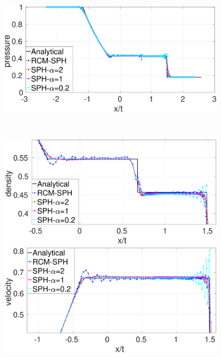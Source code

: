 \begin{figure}
\begin{minipage}{.495\textwidth}
    \end{minipage}%
    \begin{minipage}{.495 \textwidth}
        \centering
        \includegraphics[width=0.99 \textwidth]{Chapter-4/Figures/Sod/RCM-Sod-SPH-alf-p}
    \end{minipage}%
    \\
    \begin{minipage}{.495\textwidth}
        \centering
        \includegraphics[width=0.99 \textwidth]{Chapter-4/Figures/Sod/RCM-Sod-SPH-alf-rho-zoom}
    \end{minipage}%
    \begin{minipage}{.495 \textwidth}
        \centering
        \includegraphics[width=0.99 \textwidth]{Chapter-4/Figures/Sod/RCM-Sod-SPH-alf-v-zoom}

\end{minipage}
\end{figure}
